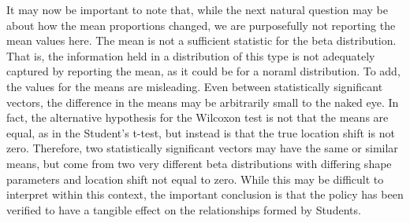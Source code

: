 It may now be important to note that, while the next natural question may be about how the mean proportions changed, we are purposefully not reporting the mean values here. The mean is 
not a sufficient statistic for the beta distribution. That is, the information held in a distribution of this type is not adequately captured by reporting the mean, as it could be for a noraml distribution. To add, the values for the means are misleading. Even between statistically significant vectors, the difference in the means may be arbitrarily small to the naked eye. In fact, the alternative hypothesis for the Wilcoxon test is not that the means are equal, as in the Student's t-test, but instead is that the true location shift is not zero. Therefore, two statistically significant vectors may have the same or similar means, but come from two very different beta distributions with differing shape parameters and location shift not equal to zero. While this may be difficult to interpret within this context, the important conclusion is that the policy has been verified to have a tangible effect on the relationships formed by Students.






